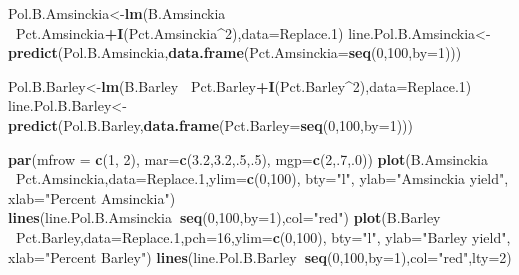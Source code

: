 \documentclass[letterpaper,]{book}
\newenvironment{Shaded}{\begin{snugshade}}{\end{snugshade}}
\newcommand{\DataTypeTok}[1]{\textcolor[rgb]{0.13,0.29,0.53}{#1}}
\newcommand{\DecValTok}[1]{\textcolor[rgb]{0.00,0.00,0.81}{#1}}
\newcommand{\FloatTok}[1]{\textcolor[rgb]{0.00,0.00,0.81}{#1}}
\newcommand{\KeywordTok}[1]{\textcolor[rgb]{0.13,0.29,0.53}{\textbf{#1}}}
\newcommand{\NormalTok}[1]{#1}
\newcommand{\OperatorTok}[1]{\textcolor[rgb]{0.81,0.36,0.00}{\textbf{#1}}}
\newcommand{\StringTok}[1]{\textcolor[rgb]{0.31,0.60,0.02}{#1}}
\begin{document}
\begin{Shaded}
\begin{Highlighting}[]
\NormalTok{Pol.B.Amsinckia<-}\KeywordTok{lm}\NormalTok{(B.Amsinckia }\OperatorTok{~}\NormalTok{Pct.Amsinckia}\OperatorTok{+}\KeywordTok{I}\NormalTok{(Pct.Amsinckia}\OperatorTok{^}\DecValTok{2}\NormalTok{),}\DataTypeTok{data=}\NormalTok{Replace}\FloatTok{.1}\NormalTok{)}
\NormalTok{line.Pol.B.Amsinckia<-}\KeywordTok{predict}\NormalTok{(Pol.B.Amsinckia,}\KeywordTok{data.frame}\NormalTok{(}\DataTypeTok{Pct.Amsinckia=}\KeywordTok{seq}\NormalTok{(}\DecValTok{0}\NormalTok{,}\DecValTok{100}\NormalTok{,}\DataTypeTok{by=}\DecValTok{1}\NormalTok{)))}

\NormalTok{Pol.B.Barley<-}\KeywordTok{lm}\NormalTok{(B.Barley }\OperatorTok{~}\NormalTok{Pct.Barley}\OperatorTok{+}\KeywordTok{I}\NormalTok{(Pct.Barley}\OperatorTok{^}\DecValTok{2}\NormalTok{),}\DataTypeTok{data=}\NormalTok{Replace}\FloatTok{.1}\NormalTok{)}
\NormalTok{line.Pol.B.Barley<-}\KeywordTok{predict}\NormalTok{(Pol.B.Barley,}\KeywordTok{data.frame}\NormalTok{(}\DataTypeTok{Pct.Barley=}\KeywordTok{seq}\NormalTok{(}\DecValTok{0}\NormalTok{,}\DecValTok{100}\NormalTok{,}\DataTypeTok{by=}\DecValTok{1}\NormalTok{)))}

\KeywordTok{par}\NormalTok{(}\DataTypeTok{mfrow =} \KeywordTok{c}\NormalTok{(}\DecValTok{1}\NormalTok{, }\DecValTok{2}\NormalTok{), }\DataTypeTok{mar=}\KeywordTok{c}\NormalTok{(}\FloatTok{3.2}\NormalTok{,}\FloatTok{3.2}\NormalTok{,.}\DecValTok{5}\NormalTok{,.}\DecValTok{5}\NormalTok{), }\DataTypeTok{mgp=}\KeywordTok{c}\NormalTok{(}\DecValTok{2}\NormalTok{,.}\DecValTok{7}\NormalTok{,.}\DecValTok{0}\NormalTok{))}
\KeywordTok{plot}\NormalTok{(B.Amsinckia }\OperatorTok{~}\NormalTok{Pct.Amsinckia,}\DataTypeTok{data=}\NormalTok{Replace}\FloatTok{.1}\NormalTok{,}\DataTypeTok{ylim=}\KeywordTok{c}\NormalTok{(}\DecValTok{0}\NormalTok{,}\DecValTok{100}\NormalTok{), }\DataTypeTok{bty=}\StringTok{"l"}\NormalTok{,}
     \DataTypeTok{ylab=}\StringTok{"Amsinckia yield"}\NormalTok{, }\DataTypeTok{xlab=}\StringTok{"Percent Amsinckia"}\NormalTok{)}
\KeywordTok{lines}\NormalTok{(line.Pol.B.Amsinckia}\OperatorTok{~}\KeywordTok{seq}\NormalTok{(}\DecValTok{0}\NormalTok{,}\DecValTok{100}\NormalTok{,}\DataTypeTok{by=}\DecValTok{1}\NormalTok{),}\DataTypeTok{col=}\StringTok{"red"}\NormalTok{)}
\KeywordTok{plot}\NormalTok{(B.Barley }\OperatorTok{~}\NormalTok{Pct.Barley,}\DataTypeTok{data=}\NormalTok{Replace}\FloatTok{.1}\NormalTok{,}\DataTypeTok{pch=}\DecValTok{16}\NormalTok{,}\DataTypeTok{ylim=}\KeywordTok{c}\NormalTok{(}\DecValTok{0}\NormalTok{,}\DecValTok{100}\NormalTok{), }\DataTypeTok{bty=}\StringTok{"l"}\NormalTok{,}
     \DataTypeTok{ylab=}\StringTok{"Barley yield"}\NormalTok{, }\DataTypeTok{xlab=}\StringTok{"Percent Barley"}\NormalTok{)}
\KeywordTok{lines}\NormalTok{(line.Pol.B.Barley}\OperatorTok{~}\KeywordTok{seq}\NormalTok{(}\DecValTok{0}\NormalTok{,}\DecValTok{100}\NormalTok{,}\DataTypeTok{by=}\DecValTok{1}\NormalTok{),}\DataTypeTok{col=}\StringTok{"red"}\NormalTok{,}\DataTypeTok{lty=}\DecValTok{2}\NormalTok{)}
\end{Highlighting}
\end{Shaded}
\end{document}
